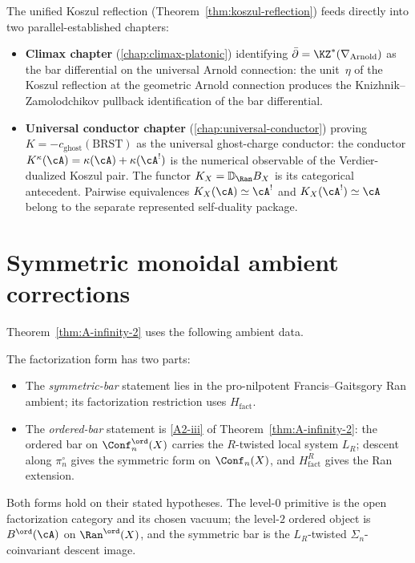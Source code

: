 \begin{remark}
\label{rem:cross-volume-bridges-to-climax-and-conductor}
The unified Koszul reflection
(Theorem~\ref{thm:koszul-reflection}) feeds directly into two
parallel-established chapters:
\begin{itemize}
\item \textbf{Climax chapter} \textup{(}\ref{chap:climax-platonic})
identifying $\bar\partial=\KZ^{*}(\nabla_{\Arnold})$ as the bar
differential on the universal Arnold connection: the unit~$\eta$ of
the Koszul reflection at the geometric Arnold connection produces the
Knizhnik--Zamolodchikov pullback identification of the bar
differential.
\item \textbf{Universal conductor chapter}
\textup{(}\ref{chap:universal-conductor}) proving
$K=-c_{\mathrm{ghost}}(\mathrm{BRST})$ as the universal ghost-charge
conductor: the conductor
$K^{\kappa}(\cA)=\kappa(\cA)+\kappa(\cA^{!})$ is the numerical
observable of the Verdier-dualized Koszul pair.  The functor
$K_X=\mathbb D_{\Ran}B_X$ is its categorical antecedent.  Pairwise
equivalences
$K_X(\cA)\simeq\cA^!$ and $K_X(\cA^!)\simeq\cA$
belong to the separate represented self-duality package.
\end{itemize}
\end{remark}

\section{Symmetric monoidal ambient corrections}\label{sec:ainf2-heals}

Theorem~\ref{thm:A-infinity-2} uses the following ambient data.

\begin{remark}
\label{rem:ainf2-heal-69}

The factorization form has two parts:
\begin{itemize}
\item[\textsc{Symmetric}:] The \emph{symmetric-bar} statement lies
in the pro-nilpotent Francis--Gaitsgory Ran ambient; its
factorization restriction uses $H_{\mathrm{fact}}$.
\item[\textsc{Ordered}:] The \emph{ordered-bar} statement is
\ref{A2-iii} of Theorem~\ref{thm:A-infinity-2}: the
ordered bar on $\Conf_n^{\ord}(X)$ carries the $R$-twisted local system
$L_R$; descent along $\pi_n^\circ$ gives the symmetric form on
$\Conf_n(X)$, and $H_{\mathrm{fact}}^{R}$ gives the Ran extension.
\end{itemize}
Both forms hold on their stated hypotheses. The level-$0$
primitive is the open factorization category and its chosen vacuum;
the level-$2$ ordered object is $B^{\ord}(\cA)$ on $\Ran^{\ord}(X)$,
and the symmetric bar is the $L_R$-twisted $\Sigma_n$-coinvariant
descent image.
\end{remark}

